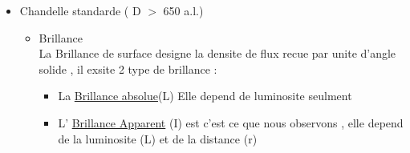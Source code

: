 \documentclass[12pt]{book}
\begin{document}
\begin{itemize}
            \item Chandelle standarde  ( D $>$ 650 a.l.)\\
                \begin{itemize}
                    \item Brillance \\
                        La Brillance de surface designe la densite de flux recue par unite d'angle solide , il exsite 2 type de brillance :
                        \begin{itemize}
                            \item La \underline{ Brillance absolue}(L) Elle depend de luminosite seulment
                            \item L' \underline{ Brillance Apparent} (I) est c'est ce que nous observons , elle depend de la luminosite (L) et de la distance (r) 
                           

\end{itemize}
\end{itemize}
\end{itemize}
\end{document}
